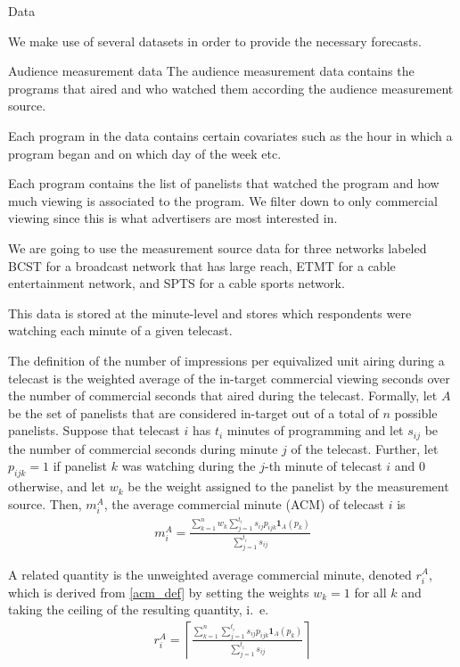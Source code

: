 \begin{chapter}{Data}\label{data}

We make use of several datasets in order to provide the necessary forecasts.

\begin{section}{Audience measurement data}
  The audience measurement data contains the programs that aired and who
  watched them according the audience measurement source.

  Each program in the data contains certain covariates such as the hour in which
  a program began and on which day of the week etc.

  Each program contains the list of panelists that watched the program and how much
  viewing is associated to the program. We filter down to only commercial viewing
  since this is what advertisers are most interested in.

  We are going to use the measurement source data for three networks labeled BCST
  for a broadcast network that has large reach, ETMT for a cable entertainment network,
  and SPTS for a cable sports network.

  This data is stored at the minute-level
  and stores which respondents were watching each minute of a given telecast.

  The definition of the number of impressions per equivalized unit airing
  during a telecast is the weighted average of the in-target commercial viewing seconds over the number of commercial seconds that aired during the telecast.
  Formally, let $A$ be the set of panelists that are considered in-target out of a total of $n$ possible panelists.
  Suppose that telecast $i$ has $t_i$ minutes of programming and let
  $s_{ij}$ be the number of commercial seconds during minute $j$ of the telecast.
  Further, let $p_{ijk} = 1$ if panelist $k$ was watching during the $j$-th minute of telecast $i$ and 0 otherwise,
  and let $w_{k}$ be the weight assigned to the panelist by the measurement source. Then, $m_{i}^A$, the average commercial minute (ACM) of telecast $i$
  is
  \begin{align}\label{acm_def}
    m_{i}^A = \frac{\sum_{k=1}^n w_k \sum_{j=1}^{t_i} s_{ij} p_{ijk} \textbf{1}_A(p_{k})}{\sum_{j=1}^{t_i} s_{ij}}
  \end{align}

  A related quantity is the unweighted average commercial minute, denoted $r_{i}^A$, which is
  derived from \eqref{acm_def} by setting the weights $w_k = 1$ for all $k$ and taking the ceiling of the resulting quantity, i.\ e.\
  \begin{align*}
    r_{i}^A = \left\lceil\frac{\sum_{k=1}^n \sum_{j=1}^{t_i} s_{ij} p_{ijk} \textbf{1}_A(p_{k})}{\sum_{j=1}^{t_i} s_{ij}}\right\rceil
  \end{align*}


\end{section}
\end{chapter}
